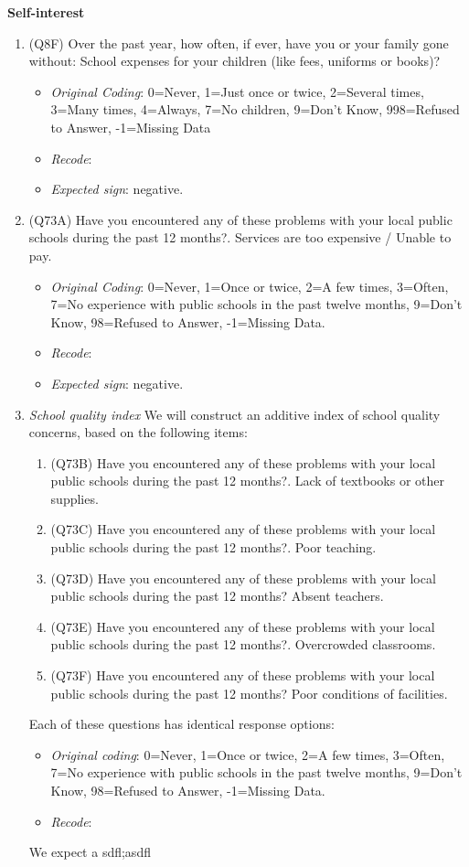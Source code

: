 \documentclass[]{article}
\begin{document}
\textbf{Self-interest}

\begin{enumerate}
  \item (Q8F) Over the past year, how often, if ever, have you or your family gone without: School expenses for your children (like fees, uniforms or books)?
  \begin{itemize}
  \item \textit{Original Coding}: 0=Never, 1=Just once or twice, 2=Several times, 3=Many times, 4=Always, 7=No children, 9=Don’t Know, 998=Refused to Answer, -1=Missing Data
  \item \textit{Recode}:  
  \item \textit{Expected sign}: negative.
  \end{itemize}
  \item (Q73A) Have you encountered any of these problems with your local public schools during the past 12 months?. Services are too expensive / Unable to pay.
  \begin{itemize}
  \item \textit{Original Coding}: 0=Never, 1=Once or twice, 2=A few times, 3=Often, 7=No experience with public schools in the past twelve months, 9=Don’t Know, 98=Refused to Answer, -1=Missing Data.
  \item \textit{Recode}:  
  \item \textit{Expected sign}: negative.
  \end{itemize}
  \item \textit{School quality index} We will construct an additive index of school quality concerns, based on the following items:
  \begin{enumerate}
    \item (Q73B) Have you encountered any of these problems with your local public schools during the past 12 months?. Lack of textbooks or other supplies.
    \item (Q73C) Have you encountered any of these problems with your local public schools during the past 12 months?. Poor teaching.
    \item (Q73D) Have you encountered any of these problems with your local public schools during the past 12 months? Absent teachers.
    \item (Q73E) Have you encountered any of these problems with your local public schools during the past 12 months?. Overcrowded classrooms.
    \item (Q73F) Have you encountered any of these problems with your local public schools during the past 12 months? Poor conditions of facilities.
  \end{enumerate}
  Each of these questions has identical response options:
      \begin{itemize}
    \item \textit{Original coding}: 0=Never, 1=Once or twice, 2=A few times, 3=Often, 7=No experience with public schools in the past twelve months, 9=Don’t Know, 98=Refused to Answer, -1=Missing Data.
    \item \textit{Recode}:   
    \end{itemize}
  We expect a sdfl;asdfl
\end{enumerate}
\end{document}
